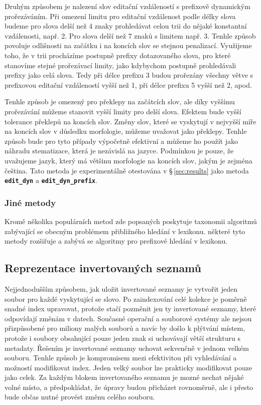 \documentclass[11pt,letterpaper,oneside,openright]{book}
\newcommand{\bftt}[1]{\texttt{\textbf{#1}}}
\begin{document}
Druhým způsobem je nalezení slov editační vzdáleností s prefixově dynamickým
prořezáváním. Při omezení limitu pro editační vzdálenost podle délky slova
budeme pro slova delší než 4 znaky prohledávat celou trii do nějaké konstantní
vzdálenosti, např. 2. Pro slova delší než 7 znaků s limitem např. 3. Tenhle
způsob povoluje odlišnosti na začátku i na koncích slov se stejnou penalizací.
Využijeme toho, že v trii procházíme postupně prefixy dotazovaného slova, pro
které stanovíme stejné prořezávací limity, jako kdybychom postupně prohledávali
prefixy jako celá slova. Tedy při délce prefixu 3 budou prořezány všechny větve
s prefixovou editační vzdáleností vyšší než 1, při délce prefixu 5 vyšší než 2,
apod. 

Tenhle způsob je omezený pro překlepy na začátcích slov, ale díky vyššímu
prořezávání můžeme stanovit vyšší limity pro delší slova. Efektem bude vyšší
tolerance překlepů na koncích slov. Změny slov, které se vyskytují v nejvyšší
míře na koncích slov v důsledku morfologie, můžeme uvažovat jako překlepy.
Tenhle způsob bude pro tyto případy výpočetně efektivní a můžeme ho použít jako
náhradu stematizace, která je nezávislá na jazyce. Podmínkou je pouze, že
uvažujeme jazyk, který má většinu morfologie na koncích slov, jakým je zejména
čeština. Tato metoda je experimentálně otestována v \S\,\ref{sec:results} jako
metoda \bftt{edit\_dyn} a \bftt{edit\_dyn\_prefix}.



\subsubsection{Jiné metody}
Kromě několika populárních metod zde popsaných poskytuje
\cite{Boytsov:2011:IMA:1963190.1963191} taxonomii algoritmů zabývající se
obecným problémem přibližného hledání v lexikonu.
\cite{Bast:2013:EFS:2457465.2457470} některé tyto metody rozšiřuje a zabývá se
algoritmy pro prefixové hledání v lexikonu.



\subsection{Reprezentace invertovaných seznamů}
Nejjednodušším způsobem, jak uložit invertované seznamy je vytvořit jeden
soubor pro každé vyskytující se slovo. Po zaindexování celé kolekce je poměrně
snadné index upravovat, protože stačí pozměnit jen ty invertované seznamy,
které odpovídají změnám v datech. Současné operační a souborové systémy ale
nejsou přizpůsobené pro miliony malých souborů a navíc by došlo k plýtvání
místem, protože i soubory obsahující pouze jeden znak si uchovávají větší
strukturu s metadaty. Řešením je invertované seznamy uchovat sekvenčně v jednom
velkém souboru. Tenhle způsob je kompromisem mezi efektivitou při vyhledávání a
možností modifikovat index. Jeden velký soubor lze prakticky modifikovat pouze
jako celek. Za každým blokem invertovaného seznamu je mozné nechat nějaké volné
místo, a předpokládat, že úpravy budou přicházet rovnoměrně, ale i přesto bude
občas nutné provést změnu celého souboru.
\end{document}
